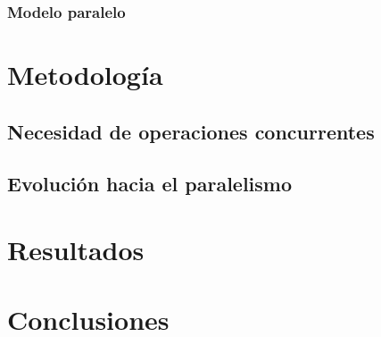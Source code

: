\documentclass[letterpaper,12pt,oneside]{book}
\begin{document}
\subsection{Modelo paralelo}


\chapter{Metodología}  %
	\section{Necesidad de operaciones concurrentes}
	
	 \section{Evolución hacia el paralelismo}

\chapter{Resultados}  %


\chapter{Conclusiones}

%
%

\end{document}
